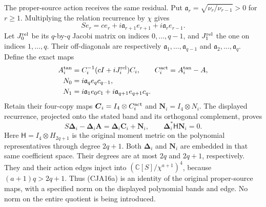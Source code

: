 The proper-source action receives the same residual.
Put \(\mathfrak a_r=\sqrt{\nu_r/\nu_{r-1}}>0\) for \(r\geq1\).
Multiplying the relation recurrence by \(\chi\) gives
\[
 Se_r=ce_r+i\mathfrak a_{r+1}e_{r+1}
                      +i\mathfrak a_re_{r-1}.
 \]
Let \(J_0^{\rm rel}\) be its \(q\)-by-\(q\) Jacobi matrix on
indices \(0,\ldots,q-1\), and \(J_1^{\rm rel}\) the one on
indices \(1,\ldots,q\).  Their off-diagonals are respectively
\(\mathfrak a_1,\ldots,\mathfrak a_{q-1}\) and
\(\mathfrak a_2,\ldots,\mathfrak a_q\).
Define the exact maps
\[
 \begin{split}
 A_i^{\rm tan}&=C_i^{-1}(cI+iJ_i^{\rm rel})C_i,\qquad
 C_i^{\rm act}=A_i^{\rm tan}-A,\\
 N_0&=i\mathfrak a_qe_qc_{q-1},\\
 N_1&=i\mathfrak a_1e_0c_1+
                         i\mathfrak a_{q+1}e_{q+1}c_q .
 \end{split}
 \]
Retain their four-copy maps
\(\boldsymbol C_i=I_4\otimes C_i^{\rm act}\) and
\(\boldsymbol N_i=I_4\otimes N_i\).
The displayed recurrence, projected onto the stated band and its
orthogonal complement, proves
\begin{equation}
 S\boldsymbol\Delta_i-\boldsymbol\Delta_i\mathbf A
    =\boldsymbol\Delta_i\boldsymbol C_i+\boldsymbol N_i,
 \qquad
 \boldsymbol\Delta_i^*\mathsf H\boldsymbol N_i=0.
 \tag{CJA16a}
\end{equation}
Here \(\mathsf H=I_4\otimes H_{2q+1}\) is the original moment
metric on the polynomial representatives through degree \(2q+1\).
Both \(\boldsymbol\Delta_i\) and \(\boldsymbol N_i\) are embedded
in that same coefficient space.
Their degrees are at most \(2q\) and \(2q+1\), respectively.
They and their action edges inject into
\((\mathbb C[S]/\chi^{a+1})^4\), because
\((a+1)q>2q+1\).
Thus (CJA16a) is an identity of the original proper-source maps,
with a specified norm on the displayed polynomial bands and edge.
No norm on the entire quotient is being introduced.

